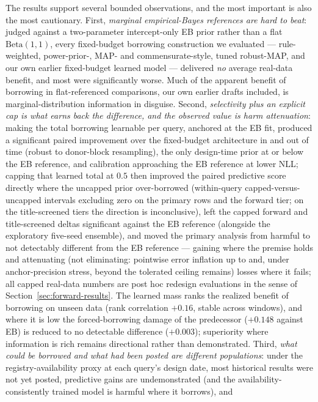 \documentclass[11pt]{article}
\begin{document}
The results support several bounded observations, and the most important is
also the most cautionary. First, \emph{marginal empirical-Bayes references are
hard to beat}: judged against a two-parameter intercept-only EB prior rather
than a flat $\mathrm{Beta}(1,1)$, every fixed-budget borrowing construction we
evaluated --- rule-weighted, power-prior-, MAP- and commensurate-style, tuned
robust-MAP, and our own earlier fixed-budget learned model --- delivered
\emph{no} average real-data benefit, and most were significantly worse. Much
of the apparent benefit of borrowing in flat-referenced comparisons, our own
earlier drafts included, is marginal-distribution information in disguise.
Second, \emph{selectivity plus an explicit cap is what earns back the
difference, and the observed value is harm attenuation}: making
the total borrowing learnable per query, anchored at the EB fit, produced a
significant paired improvement over the fixed-budget architecture in and out
of time (robust to donor-block resampling), the only design-time prior at or
below the EB reference, and calibration
approaching the EB reference at lower NLL; capping that learned total at
$0.5$ then improved the paired predictive score directly where the
uncapped prior over-borrowed (within-query capped-versus-uncapped
intervals excluding zero on the primary rows and the forward tier; on
the title-screened tiers the direction is inconclusive), left the capped
forward and title-screened deltas significant against the EB reference
(alongside the exploratory five-seed ensemble), and moved the primary analysis from
harmful to not detectably different from the EB reference --- gaining where
the premise holds and attenuating (not eliminating: pointwise error
inflation up to and, under anchor-precision stress, beyond the tolerated
ceiling remains) losses where it fails; all capped real-data numbers are
post hoc redesign evaluations in the sense of
Section~\ref{sec:forward-results}. The learned
mass ranks
the realized benefit of borrowing on unseen data (rank correlation $+0.16$,
stable across windows), and where it is low the forced-borrowing damage of
the predecessor ($+0.148$ against EB) is reduced to no detectable
difference ($+0.003$); superiority where information is rich remains directional rather
than demonstrated. Third, \emph{what could be borrowed and what had been
posted are different populations}: under the registry-availability proxy at
each query's design date, most historical results were not yet
posted, predictive gains are undemonstrated (and the
availability-consistently trained model is harmful where it borrows), and
\end{document}
